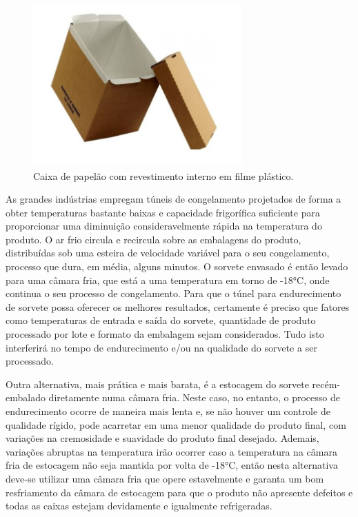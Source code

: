 \documentclass[10pt,a4paper]{article}
\begin{document}
\begin{figure}[h]
\centering
\includegraphics[width=8cm]{Figuras/armazenamento.jpg}
\caption{Caixa de papelão com revestimento interno em filme plástico.%
}
\end{figure}

As grandes indústrias empregam túneis de congelamento projetados de forma a obter temperaturas bastante baixas e capacidade frigorífica suficiente para proporcionar uma diminuição consideravelmente rápida na temperatura do produto. O ar frio circula e recircula sobre as embalagens do produto, distribuídas sob uma esteira de velocidade variável para o seu congelamento, processo que dura, em média, alguns minutos. O sorvete envasado é então levado para uma câmara fria, que está a uma temperatura em torno de -18°C, onde continua o seu processo de congelamento. Para que o túnel para endurecimento de sorvete possa oferecer os melhores resultados, certamente é preciso que fatores como temperaturas de entrada e saída do sorvete, quantidade de produto processado por lote e formato da embalagem sejam considerados. Tudo isto interferirá no tempo de endurecimento e/ou na qualidade do sorvete a ser processado.

Outra alternativa, mais prática e mais barata, é a estocagem do sorvete recém-embalado diretamente numa câmara fria. Neste caso, no entanto, o processo de endurecimento ocorre de maneira mais lenta e, se não houver um controle de qualidade rígido, pode acarretar em uma menor qualidade do produto final, com variações na cremosidade e suavidade do produto final desejado. Ademais, variações abruptas na temperatura irão ocorrer caso a temperatura na câmara fria de estocagem não seja mantida por volta de -18°C, então nesta alternativa deve-se utilizar uma câmara fria que opere estavelmente e garanta um bom resfriamento da câmara de estocagem para que o produto não apresente defeitos e todas as caixas estejam devidamente e igualmente refrigeradas.
\end{document}
